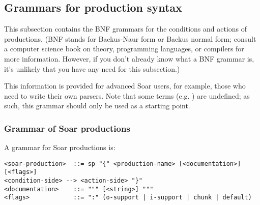 \subsection{Grammars for production syntax} %
\label{GRAMMARS}

This subsection contains the BNF grammars for the conditions and actions of productions. (BNF stands for Backus-Naur form or Backus normal form; consult a computer science book on theory, programming languages, or compilers for more information. However, if you don't already know what a BNF grammar is, it's unlikely that you have any need for this subsection.)

This information is provided for advanced Soar users, for example, those who need to write their own parsers. Note that some terms (e.g. ) are undefined; as such, this grammar should only be used as a starting point.




\subsubsection{Grammar of Soar productions}

A grammar for Soar productions is:

\begin{verbatim}
<soar-production>  ::= sp "{" <production-name> [<documentation>] [<flags>]
<condition-side> --> <action-side> "}"
<documentation>    ::= """ [<string>] """
<flags>            ::= ":" (o-support | i-support | chunk | default)
\end{verbatim}

